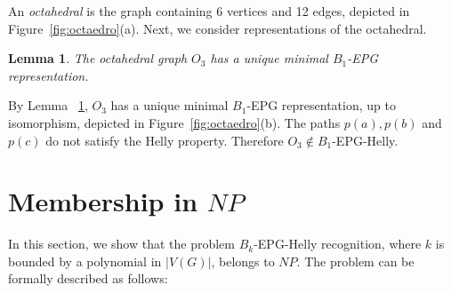 \documentclass[9pt]{entcs}
\newtheorem{lema}{Lemma}[section]
\newtheorem{prove}{Proof}[section]
\begin{document}
An \textit{octahedral} is the graph containing 6 vertices and 12 edges, depicted  in Figure~\ref{fig:octaedro}(a). Next, we consider representations of the octahedral.

\begin{lema}\label{lem:octaedronaohelly}
The octahedral graph $O_3$ has a unique minimal  $ B_1$-EPG representation.%
\end{lema}


 

By Lemma ~\ref{lem:octaedronaohelly},  $ O_3 $ has a unique minimal $B_1$-EPG representation, up to isomorphism, depicted in Figure~\ref{fig:octaedro}(b). The paths $ p(a), p(b) $ and $ p(c) $  do not satisfy the Helly property. Therefore $O_3 \notin B_1$-EPG-Helly. 

\section{Membership in $NP$}

In this section, we show that the problem $B_k$-EPG-Helly recognition, where $k$ is bounded by a polynomial in $|V(G)|$, belongs to $NP$. The problem can be formally described as follows:
\end{document}
